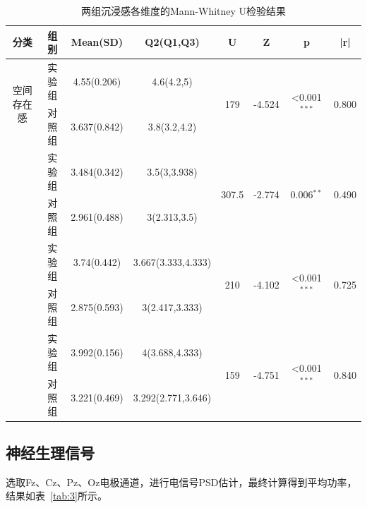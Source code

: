 \documentclass[runningheads]{llncs}
\begin{document}
\begin{table}[t]
\centering
\setlength{\tabcolsep}{2.5pt} %
\caption{两组沉浸感各维度的Mann-Whitney U检验结果}
\label{tab:immersion}
\begin{tabularx}{\textwidth}{cccccccc}
\toprule
\textbf{分类} & \textbf{组别} & \textbf{Mean(SD)} & \textbf{Q2(Q1,Q3)} & \textbf{U} & \textbf{Z} & \textbf{p} & \textbf{|r|} \\
\midrule
\multirow{2}{*}{空间存在感} 
& 实验组 & 4.55(0.206) & 4.6(4.2,5) & \multirow{2}{*}{179} & \multirow{2}{*}{-4.524} & \multirow{2}{*}{<0.001\(^{***}\)} & \multirow{2}{*}{0.800} \\
& 对照组 & 3.637(0.842) & 3.8(3.2,4.2) \\
\addlinespace
\multirow{2}{*}{投入感} 
& 实验组 & 3.484(0.342) & 3.5(3,3.938) & \multirow{2}{*}{307.5} & \multirow{2}{*}{-2.774} & \multirow{2}{*}{0.006\(^{**}\)} & \multirow{2}{*}{0.490} \\
& 对照组 & 2.961(0.488) & 3(2.313,3.5) \\
\addlinespace
\multirow{2}{*}{真实性} 
& 实验组 & 3.74(0.442) & 3.667(3.333,4.333) & \multirow{2}{*}{210} & \multirow{2}{*}{-4.102} & \multirow{2}{*}{<0.001\(^{***}\)} & \multirow{2}{*}{0.725} \\
& 对照组 & 2.875(0.593) & 3(2.417,3.333) \\
\addlinespace
\multirow{2}{*}{沉浸感} 
& 实验组 & 3.992(0.156) & 4(3.688,4.333) & \multirow{2}{*}{159} & \multirow{2}{*}{-4.751} & \multirow{2}{*}{<0.001\(^{***}\)} & \multirow{2}{*}{0.840} \\
& 对照组 & 3.221(0.469) & 3.292(2.771,3.646) \\
\bottomrule
\end{tabularx}
\end{table}

\subsection{神经生理信号}
选取Fz、Cz、Pz、Oz电极通道，进行电信号PSD估计，最终计算得到平均功率，结果如表~\ref{tab:3}所示。
\end{document}
